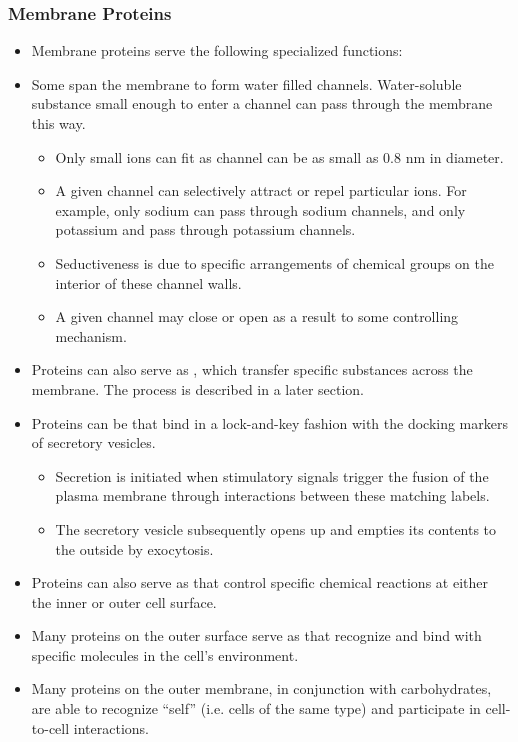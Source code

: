 \documentclass{article}
\numberwithin{equation}{section}
\begin{document}
\subsubsection{Membrane Proteins}
\begin{itemize}
    \item Membrane proteins serve the following specialized functions:
    \item Some span the membrane to form water filled channels. Water-soluble substance small enough to enter a channel can pass through the membrane this way.
    \begin{itemize}
        \item Only small ions can fit as channel can be as small as $0.8\text{ nm}$ in diameter.
        \item A given channel can selectively attract or repel particular ions. For example, only sodium can pass through sodium channels, and only potassium and pass through potassium channels.
        \item Seductiveness is due to specific arrangements of chemical groups on the interior of these channel walls.
        \item A given channel may close or open as a result to some controlling mechanism.
    \end{itemize}
    \item Proteins can also serve as , which transfer specific substances across the membrane. The process is described in a later section.
    \item Proteins can be  that bind in a lock-and-key fashion with the docking markers of secretory vesicles.
    \begin{itemize}
        \item Secretion is initiated when stimulatory signals trigger the fusion of the plasma membrane through interactions between these matching labels.
        \item The secretory vesicle subsequently opens up and empties its contents to the outside by exocytosis.
    \end{itemize}
    \item Proteins can also serve as  that control specific chemical reactions at either the inner or outer cell surface.
    \item Many proteins on the outer surface serve as  that recognize and bind with specific molecules in the cell's environment.
    \item Many proteins on the outer membrane, in conjunction with carbohydrates, are able to recognize ``self'' (i.e. cells of the same type) and participate in cell-to-cell interactions.
\end{itemize}
\end{document}
